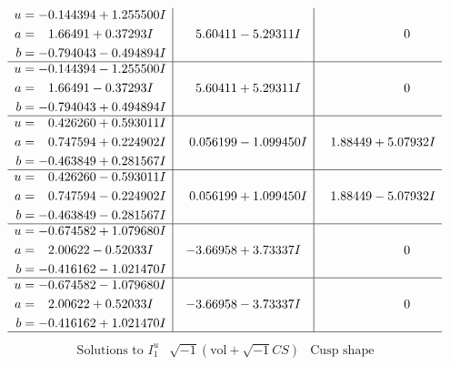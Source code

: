 \documentclass[1p]{elsarticle_modified}
\theoremstyle{definition}
\newcommand{\I}{\sqrt{-1}}
\begin{document}
$$\begin{array}{c|c|c}
\begin{aligned}
u &= -0.144394 + 1.255500 I \\
a &= \phantom{-}1.66491 + 0.37293 I \\
b &= -0.794043 - 0.494894 I\end{aligned}
 & \phantom{-}5.60411 - 5.29311 I & \phantom{-0.000000 } 0 \\ \hline\begin{aligned}
u &= -0.144394 - 1.255500 I \\
a &= \phantom{-}1.66491 - 0.37293 I \\
b &= -0.794043 + 0.494894 I\end{aligned}
 & \phantom{-}5.60411 + 5.29311 I & \phantom{-0.000000 } 0 \\ \hline\begin{aligned}
u &= \phantom{-}0.426260 + 0.593011 I \\
a &= \phantom{-}0.747594 + 0.224902 I \\
b &= -0.463849 + 0.281567 I\end{aligned}
 & \phantom{-}0.056199 - 1.099450 I & \phantom{-}1.88449 + 5.07932 I \\ \hline\begin{aligned}
u &= \phantom{-}0.426260 - 0.593011 I \\
a &= \phantom{-}0.747594 - 0.224902 I \\
b &= -0.463849 - 0.281567 I\end{aligned}
 & \phantom{-}0.056199 + 1.099450 I & \phantom{-}1.88449 - 5.07932 I \\ \hline\begin{aligned}
u &= -0.674582 + 1.079680 I \\
a &= \phantom{-}2.00622 - 0.52033 I \\
b &= -0.416162 - 1.021470 I\end{aligned}
 & -3.66958 + 3.73337 I & \phantom{-0.000000 } 0 \\ \hline\begin{aligned}
u &= -0.674582 - 1.079680 I \\
a &= \phantom{-}2.00622 + 0.52033 I \\
b &= -0.416162 + 1.021470 I\end{aligned}
 & -3.66958 - 3.73337 I & \phantom{-0.000000 } 0\\
 \hline 
 \end{array}$$\newpage$$\begin{array}{c|c|c}  
\text{Solutions to }I^u_{1}& \I (\text{vol} + \sqrt{-1}CS) & \text{Cusp shape}\\
 \hline 
\begin{aligned}

\end{aligned}
\end{array}$$
\end{document}
